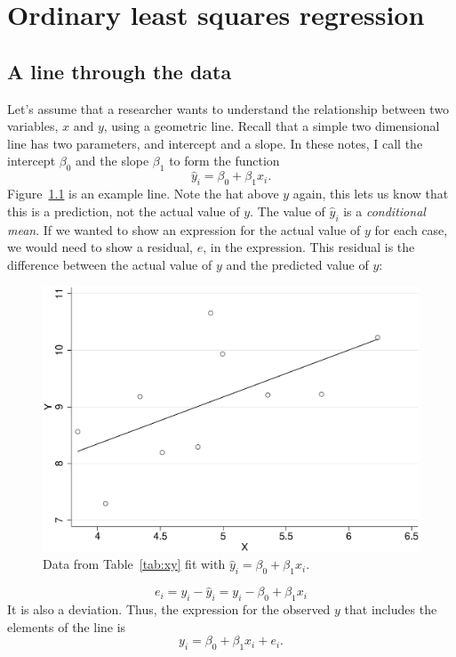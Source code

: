 

\chapter{Ordinary least squares regression}
\section{A line through the data}
Let's assume that a researcher wants to understand the relationship between two variables, $x$ and $y$, using a geometric line. Recall that a simple two dimensional line has two parameters, and intercept and a slope. In these notes, I call the intercept $\beta_0$ and the slope $\beta_1$ to form the function
\begin{equation}
\hat{y}_i=\beta_0+\beta_1x_i.
\end{equation}
Figure~\ref{fig:fit} is an example line. Note the hat above $y$ again, this lets us know that this is a prediction, not the actual value of $y$. The value of $\hat{y}_i$ is a {\it conditional mean}. If we wanted to show an expression for the actual value of $y$ for each case, we would need to show a residual, $e$, in the expression. This residual is the difference between the actual value of $y$ and the predicted value of $y$:
\begin{figure}
   \centering
   \includegraphics[angle=0,
           width=.75\textwidth]{fit.eps}
   \caption{Data from Table~\ref{tab:xy} fit with $\hat{y}_i=\beta_0+\beta_1x_i$.}
  \label{fig:fit}
\end{figure}
\begin{equation}
e_i=y_i-\hat{y}_i=y_i-\beta_0+\beta_1x_i
\end{equation}
It is also a deviation. Thus, the expression for the observed $y$ that includes the elements of the line is
\begin{equation}
y_i=\beta_0+\beta_1x_i+e_i.
\end{equation}
